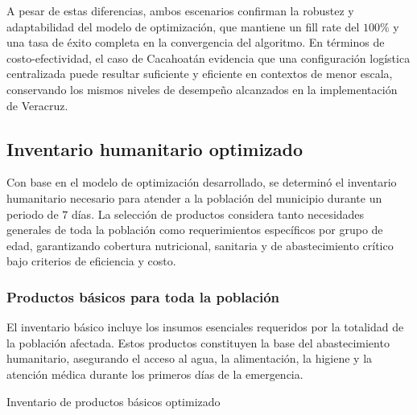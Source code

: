 \documentclass[
  spanish,
  us-letterpaper,
]{scrreprt}
\numberwithin{equation}{section}
\begin{document}
A pesar de estas diferencias, ambos escenarios confirman la robustez y
adaptabilidad del modelo de optimización, que mantiene un fill rate del
\(100\%\) y una tasa de éxito completa en la convergencia del algoritmo.
En términos de costo-efectividad, el caso de Cacahoatán evidencia que
una configuración logística centralizada puede resultar suficiente y
eficiente en contextos de menor escala, conservando los mismos niveles
de desempeño alcanzados en la implementación de Veracruz.

\subsection{Inventario humanitario
optimizado}\label{inventario-humanitario-optimizado}

Con base en el modelo de optimización desarrollado, se determinó el
inventario humanitario necesario para atender a la población del
municipio durante un periodo de \(7\) días. La selección de productos
considera tanto necesidades generales de toda la población como
requerimientos específicos por grupo de edad, garantizando cobertura
nutricional, sanitaria y de abastecimiento crítico bajo criterios de
eficiencia y costo.

\subsubsection{Productos básicos para toda la
población}\label{productos-buxe1sicos-para-toda-la-poblaciuxf3n}

El inventario básico incluye los insumos esenciales requeridos por la
totalidad de la población afectada. Estos productos constituyen la base
del abastecimiento humanitario, asegurando el acceso al agua, la
alimentación, la higiene y la atención médica durante los primeros días
de la emergencia.

Inventario de productos básicos optimizado
\end{document}
